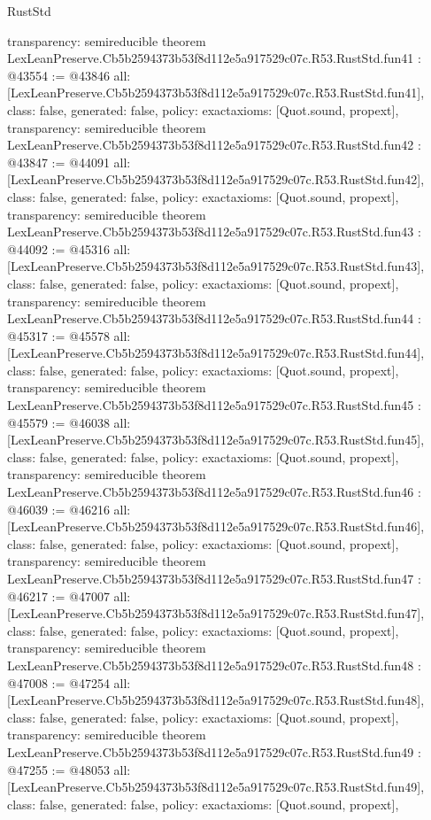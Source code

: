 \begin{lexlean}{RustStd}
\begin{coremodule}
{  transparency: semireducible
}
theorem LexLeanPreserve.Cb5b2594373b53f8d112e5a917529c07c.R53.RustStd.fun41 : @43554 := @43846 {
  all: [LexLeanPreserve.Cb5b2594373b53f8d112e5a917529c07c.R53.RustStd.fun41],
  class: false,
  generated: false,
  policy: exact{axioms: [Quot.sound, propext]},
  transparency: semireducible
}
theorem LexLeanPreserve.Cb5b2594373b53f8d112e5a917529c07c.R53.RustStd.fun42 : @43847 := @44091 {
  all: [LexLeanPreserve.Cb5b2594373b53f8d112e5a917529c07c.R53.RustStd.fun42],
  class: false,
  generated: false,
  policy: exact{axioms: [Quot.sound, propext]},
  transparency: semireducible
}
theorem LexLeanPreserve.Cb5b2594373b53f8d112e5a917529c07c.R53.RustStd.fun43 : @44092 := @45316 {
  all: [LexLeanPreserve.Cb5b2594373b53f8d112e5a917529c07c.R53.RustStd.fun43],
  class: false,
  generated: false,
  policy: exact{axioms: [Quot.sound, propext]},
  transparency: semireducible
}
theorem LexLeanPreserve.Cb5b2594373b53f8d112e5a917529c07c.R53.RustStd.fun44 : @45317 := @45578 {
  all: [LexLeanPreserve.Cb5b2594373b53f8d112e5a917529c07c.R53.RustStd.fun44],
  class: false,
  generated: false,
  policy: exact{axioms: [Quot.sound, propext]},
  transparency: semireducible
}
theorem LexLeanPreserve.Cb5b2594373b53f8d112e5a917529c07c.R53.RustStd.fun45 : @45579 := @46038 {
  all: [LexLeanPreserve.Cb5b2594373b53f8d112e5a917529c07c.R53.RustStd.fun45],
  class: false,
  generated: false,
  policy: exact{axioms: [Quot.sound, propext]},
  transparency: semireducible
}
theorem LexLeanPreserve.Cb5b2594373b53f8d112e5a917529c07c.R53.RustStd.fun46 : @46039 := @46216 {
  all: [LexLeanPreserve.Cb5b2594373b53f8d112e5a917529c07c.R53.RustStd.fun46],
  class: false,
  generated: false,
  policy: exact{axioms: [Quot.sound, propext]},
  transparency: semireducible
}
theorem LexLeanPreserve.Cb5b2594373b53f8d112e5a917529c07c.R53.RustStd.fun47 : @46217 := @47007 {
  all: [LexLeanPreserve.Cb5b2594373b53f8d112e5a917529c07c.R53.RustStd.fun47],
  class: false,
  generated: false,
  policy: exact{axioms: [Quot.sound, propext]},
  transparency: semireducible
}
theorem LexLeanPreserve.Cb5b2594373b53f8d112e5a917529c07c.R53.RustStd.fun48 : @47008 := @47254 {
  all: [LexLeanPreserve.Cb5b2594373b53f8d112e5a917529c07c.R53.RustStd.fun48],
  class: false,
  generated: false,
  policy: exact{axioms: [Quot.sound, propext]},
  transparency: semireducible
}
theorem LexLeanPreserve.Cb5b2594373b53f8d112e5a917529c07c.R53.RustStd.fun49 : @47255 := @48053 {
  all: [LexLeanPreserve.Cb5b2594373b53f8d112e5a917529c07c.R53.RustStd.fun49],
  class: false,
  generated: false,
  policy: exact{axioms: [Quot.sound, propext]},
}
\end{coremodule}
\end{lexlean}
